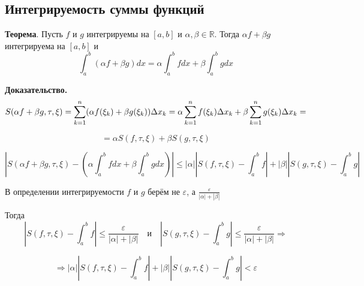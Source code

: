\documentclass[a4paper]{article}
\begin{document}
\begin{definit}
\hypertarget{p2}{}
\subsection*{Интегрируемость суммы функций}
\begin{htheorem}\textbf{Теорема}.
Пусть $f$ и $g$ интегрируемы на $[a,b]$ и $\alpha, \beta \in \mathbb{R}$. Тогда $\alpha f + \beta g$ интегрируема на $[a,b]$ и $$\int_a^b(\alpha f + \beta g)dx = \alpha \int_a^b fdx + \beta \int_a^b gdx$$
\end{htheorem}

\begin{hproof}\textbf{Доказательство.}
$$S(\alpha f + \beta g, \tau, \xi) = \sum_{k=1}^n (\alpha f(\xi_k) + \beta g(\xi_k)) \Delta x_k = \newline \alpha \sum_{k=1}^n f(\xi_k) \Delta x_k + \beta \sum_{k=1}^n g(\xi_k) \Delta x_k = $$ 

$$= \alpha S(f, \tau, \xi) + \beta S(g, \tau, \xi)$$


$$ \left| S(\alpha f + \beta g, \tau, \xi) - \left( \alpha \int_a^b fdx + \beta \int_a^b gdx \right) \right| \leq |\alpha| \left| S(f, \tau, \xi) - \int_a^b f \right| + |\beta| \left| S(g, \tau, \xi) - \int_a^b g  \right|$$

В определении интегрируемости $f$ и $g$ берём не $\varepsilon$, а $\frac{\varepsilon}{|\alpha|+|\beta|}$

Тогда $$ \left| S(f, \tau, \xi) - \int_a^b f \right| \leq \frac{\varepsilon}{|\alpha|+|\beta|}\quad \text{и} \quad \left| S(g, \tau, \xi) - \int_a^b g  \right| \leq \frac{\varepsilon}{|\alpha|+|\beta|} \Rightarrow$$

$$
\Rightarrow |\alpha| \left| S(f, \tau, \xi) - \int_a^b f \right| + |\beta| \left| S(g, \tau, \xi) - \int_a^b g  \right| < \varepsilon$$

\end{hproof}
\end{definit}
\end{document}
